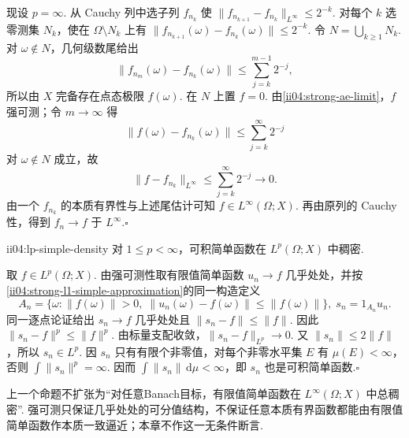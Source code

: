 \begin{FAProof}
现设 \(\displaystyle p=\infty\). 从 Cauchy 列中选子列 \(\displaystyle f_{n_k}\) 使
\(\displaystyle \|f_{n_{k+1}}-f_{n_k}\|_{L^\infty} \leqslant 2^{-k}.\)
对每个 \(\displaystyle k\) 选零测集 \(\displaystyle N_k\)，使在 \(\displaystyle\Omega\setminus N_k\) 上有
\(\displaystyle \|f_{n_{k+1}}(\omega)-f_{n_k}(\omega)\| \leqslant 2^{-k}.\)
令 \(\displaystyle N=\bigcup_{k\geqslant1}N_k\). 对 \(\displaystyle\omega\notin N\)，几何级数尾给出
\[
\|f_{n_m}(\omega)-f_{n_k}(\omega)\|
\leqslant
\sum_{j=k}^{m-1}2^{-j},
\]
所以由 \(\displaystyle X\) 完备存在点态极限 \(\displaystyle f(\omega)\). 在 \(\displaystyle N\) 上置 \(\displaystyle f=0\). 由\autoref{ii04:strong-ae-limit}，\(\displaystyle f\) 强可测；令 \(\displaystyle m\to\infty\) 得
\[
\|f(\omega)-f_{n_k}(\omega)\|
\leqslant
\sum_{j=k}^{\infty}2^{-j}
\]
对 \(\displaystyle\omega\notin N\) 成立，故
\[
\|f-f_{n_k}\|_{L^\infty}
\leqslant
\sum_{j=k}^{\infty}2^{-j}
\longrightarrow0.
\]
由一个 \(\displaystyle f_{n_k}\) 的本质有界性与上述尾估计可知 \(\displaystyle f\in L^\infty(\Omega;X)\). 再由原列的 Cauchy 性，得到 \(\displaystyle f_n\to f\) 于 \(\displaystyle L^\infty\).\hfill\(\square\)
\end{FAProof}

\begin{FAProposition}{ii04:lp-simple-density}
对 \(\displaystyle1\leqslant p<\infty\)，可积简单函数在 \(\displaystyle L^p(\Omega;X)\) 中稠密.
\end{FAProposition}

\begin{FAProof}
取 \(\displaystyle f\in L^p(\Omega;X)\). 由强可测性取有限值简单函数 \(\displaystyle u_n\to f\) 几乎处处，并按\autoref{ii04:strong-l1-simple-approximation}的同一构造定义
\[
A_n=
\{\omega:\|f(\omega)\|>0,\;\|u_n(\omega)-f(\omega)\|\leqslant\|f(\omega)\|\},\;
s_n=1_{A_n}u_n.
\]
同一逐点论证给出 \(\displaystyle s_n\to f\) 几乎处处且
\(\displaystyle \|s_n-f\| \leqslant \|f\|.\)
因此
\(\displaystyle \|s_n-f\|^p \leqslant \|f\|^p.\)
由标量支配收敛，\(\displaystyle\|s_n-f\|_{L^p}\to0\). 又 \(\displaystyle\|s_n\|\leqslant2\|f\|\)，所以 \(\displaystyle s_n\in L^p\). 因 \(\displaystyle s_n\) 只有有限个非零值，对每个非零水平集 \(\displaystyle E\) 有 \(\displaystyle\mu(E)<\infty\)，否则 \(\displaystyle\int\|s_n\|^p=\infty\). 因而 \(\displaystyle\int\|s_n\|\,\mathrm{d}\mu<\infty\)，即 \(\displaystyle s_n\) 也是可积简单函数.\hfill\(\square\)
\end{FAProof}

\begin{FAWarning}
上一个命题不扩张为“对任意Banach目标，有限值简单函数在 \(\displaystyle L^\infty(\Omega;X)\) 中总稠密”. 强可测只保证几乎处处的可分值结构，不保证任意本质有界函数都能由有限值简单函数作本质一致逼近；本章不作这一无条件断言.
\end{FAWarning}

